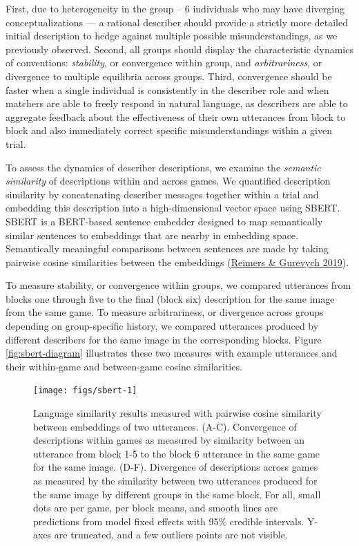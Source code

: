 \documentclass[
  english,
]{article}
\begin{document}
First, due to heterogeneity in the group -- 6 individuals who may have diverging conceptualizations --- a rational describer should provide a strictly more detailed initial description to hedge against multiple possible misunderstandings, as we previously observed.
Second, all groups should display the characteristic dynamics of conventions: \emph{stability}, or convergence within group, and \emph{arbitrariness}, or divergence to multiple equilibria across groups.
Third, convergence should be faster when a single individual is consistently in the describer role and when matchers are able to freely respond in natural language, as describers are able to aggregate feedback about the effectiveness of their own utterances from block to block and also immediately correct specific misunderstandings within a given trial.

To assess the dynamics of describer descriptions, we examine the \emph{semantic similarity} of descriptions within and across games.
We quantified description similarity by concatenating describer messages together within a trial and embedding this description into a high-dimensional vector space using SBERT.
SBERT is a BERT-based sentence embedder designed to map semantically similar sentences to embeddings that are nearby in embedding space.
Semantically meaningful comparisons between sentences are made by taking pairwise cosine similarities between the embeddings (\protect\hyperlink{ref-reimers2019}{Reimers \& Gurevych 2019}).

To measure stability, or convergence within groups, we compared utterances from blocks one through five to the final (block six) description for the same image from the same game.
To measure arbitrariness, or divergence across groups depending on group-specific history, we compared utterances produced by different describers for the same image in the corresponding blocks.
Figure \ref{fig:sbert-diagram} illustrates these two measures with example utterances and their within-game and between-game cosine similarities.

\begin{figure}[t!]

{\centering \texttt{[image: figs/sbert-1]} 

}

\caption{Language similarity results measured with pairwise cosine similarity between embeddings of two utterances. (A-C). Convergence of descriptions within games as measured by similarity between an utterance from block 1-5 to the block 6 utterance in the same game for the same image. (D-F). Divergence of descriptions across games as measured by the similarity between two utterances produced for the same image by different groups in the same block. For all, small dots are per game, per block means, and smooth lines are predictions from model fixed effects with 95\% credible intervals. Y-axes are truncated, and a few outliers points are not visible.}\label{fig:sbert}
\end{figure}
\end{document}
